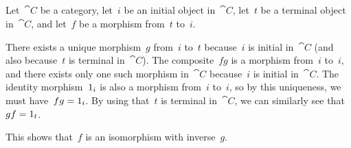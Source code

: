 \subsection{}

Let~$\cat{C}$ be a category, let~$i$ be an initial object in~$\cat{C}$, let~$t$ be a terminal object in~$\cat{C}$, and let~$f$ be a morphism from~$t$ to~$i$.

There exists a unique morphism~$g$ from~$i$ to~$t$ because~$i$ is initial in~$\cat{C}$ (and also because~$t$ is terminal in~$\cat{C}$).
The composite~$f g$ is a morphism from~$i$ to~$i$, and there exists only one such morphism in~$\cat{C}$ because~$i$ is initial in~$\cat{C}$.
The identity morphism~$1_i$ is also a morphism from~$i$ to~$i$, so by this uniqueness, we must have~$f g = 1_i$.
By using that~$t$ is terminal in~$\cat{C}$, we can similarly see that~$g f = 1_t$.

This shows that~$f$ is an isomorphism with inverse~$g$.
